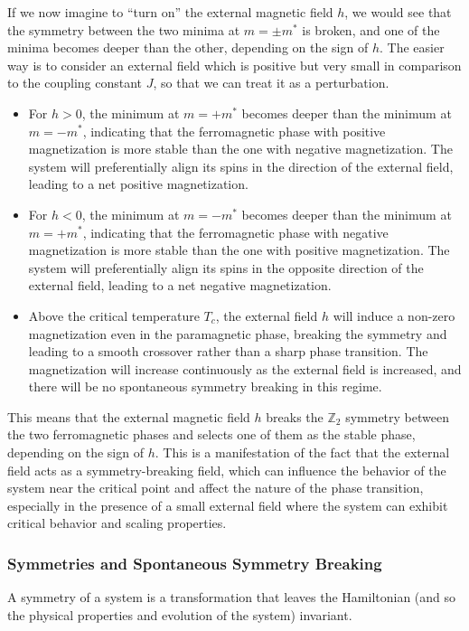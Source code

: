 If we now imagine to ``turn on'' the external magnetic field \(h\), we would see that the symmetry between the two minima at \(m = \pm m^*\) is broken, and one of the minima becomes deeper than the other, depending on the sign of \(h\). The easier way is to consider an external field which is positive but very small in comparison to the coupling constant \(J\), so that we can treat it as a perturbation.
\begin{itemize}
    \item For \(h > 0\), the minimum at \(m = +m^*\) becomes deeper than the minimum at \(m = -m^*\), indicating that the ferromagnetic phase with positive magnetization is more stable than the one with negative magnetization. The system will preferentially align its spins in the direction of the external field, leading to a net positive magnetization.
    \item For \(h < 0\), the minimum at \(m = -m^*\) becomes deeper than the minimum at \(m = +m^*\), indicating that the ferromagnetic phase with negative magnetization is more stable than the one with positive magnetization. The system will preferentially align its spins in the opposite direction of the external field, leading to a net negative magnetization.
    \item Above the critical temperature \(T_c\), the external field \(h\) will induce a non-zero magnetization even in the paramagnetic phase, breaking the symmetry and leading to a smooth crossover rather than a sharp phase transition. The magnetization will increase continuously as the external field is increased, and there will be no spontaneous symmetry breaking in this regime.
\end{itemize}
This means that the external magnetic field \(h\) breaks the \(\mathbb{Z}_2\) symmetry between the two ferromagnetic phases and selects one of them as the stable phase, depending on the sign of \(h\). This is a manifestation of the fact that the external field acts as a symmetry-breaking field, which can influence the behavior of the system near the critical point and affect the nature of the phase transition, especially in the presence of a small external field where the system can exhibit critical behavior and scaling properties.

\subsubsection{Symmetries and Spontaneous Symmetry Breaking}
A symmetry of a system is a transformation that leaves the Hamiltonian (and so the physical properties and evolution of the system) invariant.

